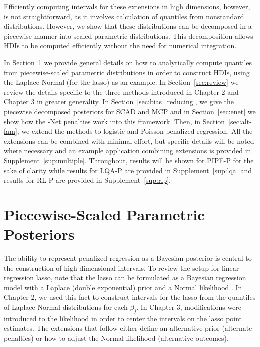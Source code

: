 Efficiently computing intervals for these extensions in high dimensions, however, is not straightforward, as it involves calculation of quantiles from nonstandard distributions. However, we show that these distributions can be decomposed in a piecewise manner into scaled parametric distributions. This decomposition allows HDIs to be computed efficiently without the need for numerical integration.

In Section~\ref{sec:laplace-normal} we provide general details on how to analytically compute quantiles from piecewise-scaled parametric distributions in order to construct HDIs, using the Laplace-Normal (for the lasso) as an example. In Section~\ref{sec:review} we review the details specific to the three methods introduced in Chapter 2 and Chapter 3 in greater generality. In Section~\ref{sec:bias_reducing}, we give the piecewise decomposed posteriors for SCAD and MCP and in Section~\ref{sec:enet} we show how the -Net penalties work into this framework. Then, in Section~\ref{sec:alt-fam}, we extend the methods to logistic and Poisson penalized regression. All the extensions can be combined with minimal effort, but specific details will be noted where necessary and an example application combining extensions is provided in Supplement~\ref{sup:multiple}. Throughout, results will be shown for PIPE-P for the sake of clarity while results for LQA-P are provided in Supplement~\ref{sup:lqa} and results for RL-P are provided in Supplement~\ref{sup:rlp}.

\section{Piecewise-Scaled Parametric Posteriors}
\label{sec:laplace-normal}

The ability to represent penalized regression as a Bayesian posterior is central to the construction of high-dimensional intervals. To review the setup for linear regression lasso, note that the lasso can be formulated as a Bayesian regression model with a Laplace (double exponential) prior and a Normal likelihood \citep{Park2008}. In Chapter 2, we used this fact to construct intervals for the lasso from the quantiles of Laplace-Normal distributions for each $\beta_j$. In Chapter 3, modifications were introduced to the likelihood in order to center the intervals on the lasso point estimates. The extensions that follow either define an alternative prior (alternate penalties) or how to adjust the Normal likelihood (alternative outcomes).

